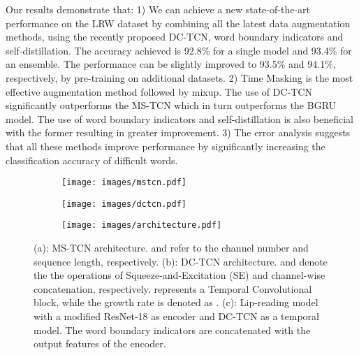 \documentclass{article}
\newcommand*\circled[1]{\tikz[baseline=(char.base)]{
            \node[shape=circle,draw,inner sep=0.3pt] (char) {#1};}}
\begin{document}
Our results demonstrate that: 1) We can achieve a new state-of-the-art performance on the LRW dataset by combining all the latest data augmentation methods, using the recently proposed DC-TCN, word boundary indicators and self-distillation. The accuracy achieved is 92.8\% for a single model and 93.4\% for an ensemble. The performance can be slightly improved to 93.5\% and 94.1\%, respectively, by pre-training on additional datasets. 2) Time Masking is the most effective augmentation method followed by mixup. The use of DC-TCN significantly outperforms the MS-TCN which in turn outperforms the BGRU model. The use of word boundary indicators and self-distillation is also beneficial with the former resulting in greater improvement. 3) The error analysis suggests that all these methods improve performance by significantly increasing the classification accuracy of difficult words.

\begin{figure*}[!t]
    \centering
    \begin{subfigure}{.31\linewidth}
        \centering
        \texttt{[image: images/mstcn.pdf]}
        \caption{}
        \label{fig:mstcn}  
    \end{subfigure}
    \qquad
    \begin{subfigure}{.31\linewidth}
        \centering
        \texttt{[image: images/dctcn.pdf]}
        \caption{}
        \label{fig:dc_tcn}  
    \end{subfigure}
    \quad
    \begin{subfigure}{.31\linewidth}
        \centering
        \texttt{[image: images/architecture.pdf]}
        \caption{}
        \label{fig:c}  
    \end{subfigure}
    \caption[architecture]{(a): MS-TCN architecture. \protect\say{} and \protect\say{} refer to the channel number and sequence length, respectively. (b): DC-TCN architecture. \circled{{\footnotesize SE}} and \circled{{\footnotesize C}} denote the the operations of Squeeze-and-Excitation (SE) \cite{hu2018squeeze} and channel-wise concatenation, respectively. \protect\say{} represents a Temporal Convolutional block, while the growth rate is denoted as \protect\say{}.
(c): Lip-reading model with a modified ResNet-18 as encoder and DC-TCN as a temporal model. The word boundary indicators are concatenated with the output features of the encoder.}
\label{fig:architecture}
\vspace{-0.5cm}
\end{figure*} \vspace{-0.3cm}
\end{document}
